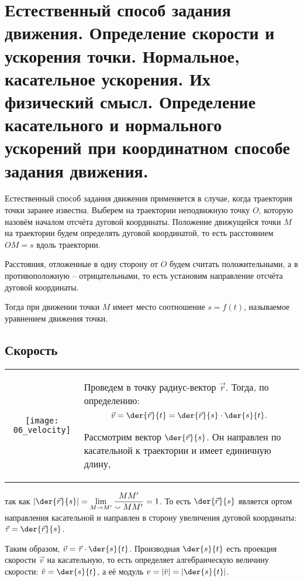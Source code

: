 \chapter{Естественный способ задания движения. Определение скорости и ускорения
точки. Нормальное, касательное ускорения. Их физический смысл. Определение
касательного и нормального ускорений при координатном способе задания движения.}

Естественный способ задания движения применяется в случае, когда траектория
точки заранее известна. Выберем на траектории неподвижную точку \( O \), которую
назовём началом отсчёта дуговой координаты. Положение движущейся точки \( M \)
на траектории будем определять дуговой координатой, то есть расстоянием
\( OM = s \) вдоль траектории.

Расстояния, отложенные в одну сторону от \( O \) будем считать положительными, а
в противоположную -- отрицательными, то есть установим направление отсчёта
дуговой координаты.

Тогда при движении точки \( M \) имеет место соотношение \( s = f(t) \),
называемое уравнением движения точки.

\section{Скорость}

\begin{table}[h!]
    \begin{tabular}{C{.37}m{.55\textwidth}}
        \texttt{[image: 06\_velocity]} &
        Проведем в точку радиус-вектор \( \vec{r} \). Тогда, по определению:
        \[
            \vec{v} = \der{\vec{r}}{t} = \der{\vec{r}}{s}\cdot\der{s}{t}.
        \]

        Рассмотрим вектор \( \ds \der{\vec{r}}{s} \). Он направлен по
        касательной к траектории и имеет единичную длину,
    \end{tabular}
\end{table}

так как \( \ds \left|\der{\vec{r}}{s}\right| = \lim_{M\to M'}\frac{MM'}
{\smallsmile MM'} = 1 \). То есть \( \ds\der{\vec{r}}{s} \) является ортом
направления касательной и направлен в сторону увеличения дуговой координаты:
\( \ds \vec{\tau} = \der{\vec{r}}{s} \).

Таким образом, \( \ds \vec{v} = \vec{\tau}\cdot\der{s}{t} \). Производная
\( \ds \der{s}{t} \) есть проекция скорости \( \vec{v} \) на касательную, то
есть определяет алгебраическую величину скорости: \( \ds \tilde{v} =
\der{s}{t} \), а её модуль \( \ds v = |\tilde{v}| = \left|\der{s}{t}\right| \).

